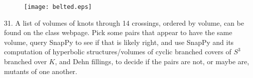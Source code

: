 \documentclass[12pt]{article}
\begin{document}
\begin{description}
\vspace{-.05in}

\begin{figure}[h]
\begin{center}
\texttt{[image: belted.eps]}
\end{center}
\end{figure} 

\vspace{-.3in}

\item{31.}  A list of volumes of knots through 14 crossings, ordered by volume, can be found on the class
webpage. Pick some pairs that appear to have the same volume, query SnapPy to see if that is 
likely right, and use SnapPy and its computation of hyperbolic
structures/volumes of cyclic branched covers of $S^3$ branched over $K$, and Dehn fillings,
to decide if the pairs are not, or maybe are, mutants of one another.

\end{description}
\vfill
\end{document}
